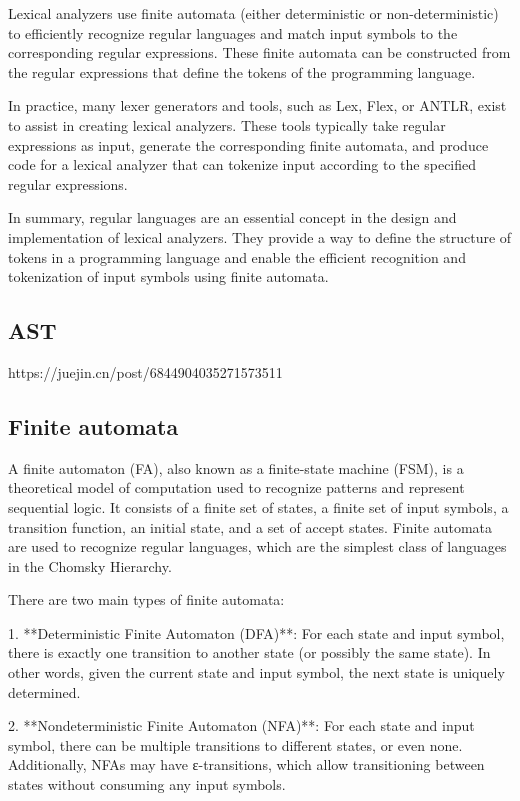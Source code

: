 \documentclass{article}
\begin{document}
Lexical analyzers use finite automata (either deterministic or non-deterministic) to efficiently recognize regular languages and match input symbols to the corresponding regular expressions. These finite automata can be constructed from the regular expressions that define the tokens of the programming language.

In practice, many lexer generators and tools, such as Lex, Flex, or ANTLR, exist to assist in creating lexical analyzers. These tools typically take regular expressions as input, generate the corresponding finite automata, and produce code for a lexical analyzer that can tokenize input according to the specified regular expressions.

In summary, regular languages are an essential concept in the design and implementation of lexical analyzers. They provide a way to define the structure of tokens in a programming language and enable the efficient recognition and tokenization of input symbols using finite automata.


\subsection{AST}

https://juejin.cn/post/6844904035271573511


\subsection{Finite automata}

A finite automaton (FA), also known as a finite-state machine (FSM), is a theoretical model of computation used to recognize patterns and represent sequential logic. It consists of a finite set of states, a finite set of input symbols, a transition function, an initial state, and a set of accept states. Finite automata are used to recognize regular languages, which are the simplest class of languages in the Chomsky Hierarchy.

There are two main types of finite automata:

1. **Deterministic Finite Automaton (DFA)**: For each state and input symbol, there is exactly one transition to another state (or possibly the same state). In other words, given the current state and input symbol, the next state is uniquely determined.

2. **Nondeterministic Finite Automaton (NFA)**: For each state and input symbol, there can be multiple transitions to different states, or even none. Additionally, NFAs may have ε-transitions, which allow transitioning between states without consuming any input symbols.
\end{document}
